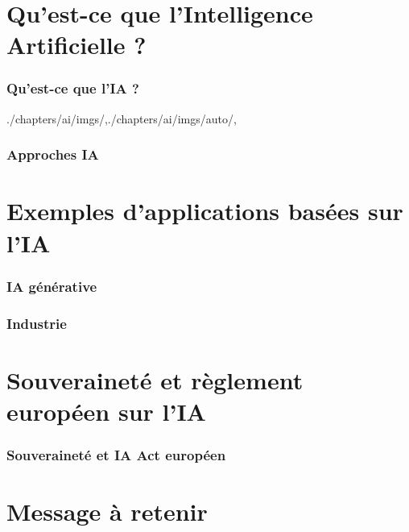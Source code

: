 \begin{bibliographysection}

\part[subtitle={Concepts et modèles clés de l'IA dans les applications modernes}]{Qu'est-ce que l'Intelligence Artificielle ?}

\section{Qu'est-ce que l'IA ?}

\begin{graphicspathcontext}{{./chapters/ai/imgs/},{./chapters/ai/imgs/auto/},\old}
	\MinskyAItrue %
	\OECDAIfalse %
	\EUAIActtrue %
	
	\localized
\end{graphicspathcontext}

\localized

\section{Approches IA}
\localized
\localized

\part{Exemples d'applications basées sur l'IA}

\section{IA générative}
\localized

\section{Industrie}
\localized

\part[subtitle={Le point de vue d'un technologue}]{Souveraineté et règlement européen sur l'IA}

\section{Souveraineté et IA Act européen}
\localized

\part{Message à retenir}

\localized

\appendix

\end{bibliographysection}

\endinput
